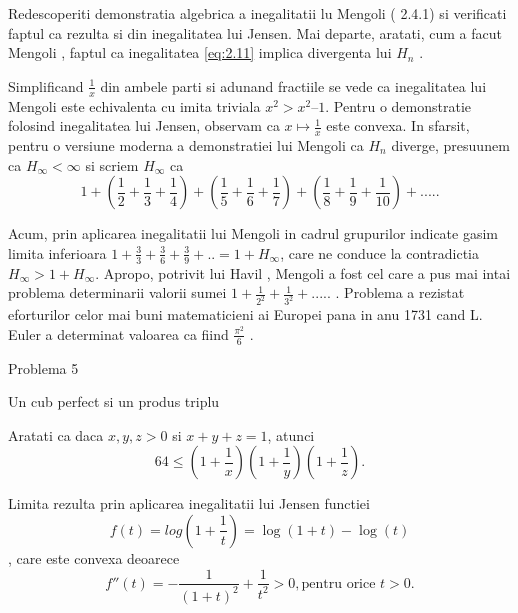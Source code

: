 \documentclass[a4paper,12pt,oneside]{report}
\begin{document}
Redescoperiti demonstratia algebrica a inegalitatii lu Mengoli ( 2.4.1) si verificati faptul ca rezulta si din inegalitatea lui Jensen. Mai departe, aratati, cum a facut Mengoli , faptul ca inegalitatea \ref{eq:2.11} implica divergenta lui \(H_{n}\) . 

Simplificand \(\frac{1}{x}\) din ambele parti si adunand fractiile se vede ca inegalitatea lui Mengoli este echivalenta cu imita triviala \(x^{2} >  x^{2} – 1\). Pentru o demonstratie folosind inegalitatea lui Jensen, observam ca \(x \mapsto \frac{1}{x}\) este convexa. In sfarsit, pentru o versiune moderna a demonstratiei lui Mengoli ca \(H_{n}\) diverge, presuunem ca \(H_{\infty }< \infty\) si scriem \(H_{\infty }\) ca 
\begin{displaymath}
  1 + \left ( \frac{1}{2} + \frac{1}{3} + \frac{1}{4} \right ) + \left ( \frac{1}{5} + \frac{1}{6} + \frac{1}{7} \right ) + \left ( \frac{1}{8} + \frac{1}{9} +\frac{1}{10} \right )+.... . 
\end{displaymath}

Acum, prin aplicarea inegalitatii lui Mengoli in cadrul grupurilor indicate gasim limita inferioara \(1 + \frac{3}{3} + \frac{3}{6} + \frac{3}{9} + ..= 1 + H_{\infty }\), care ne conduce la contradictia \(H_{\infty } > 1 + H_{\infty }\). Apropo, potrivit lui Havil , Mengoli a fost cel care a pus mai intai problema determinarii valorii sumei \(1 + \frac{1}{2^{2}} + \frac{1}{3^{2}} + .....\) .
Problema a rezistat eforturilor celor mai buni matematicieni ai Europei pana in anu 1731 cand L. Euler a determinat valoarea ca fiind \(\frac{\pi^{2}}{6}\) . 

Problema 5 

Un cub perfect si un produs triplu

Aratati ca daca \(x , y , z > 0\) si \(x+ y + z = 1\), atunci 
\begin{displaymath}
  64 \leq \left ( 1 + \frac{1}{x} \right )\left ( 1 + \frac{1}{y} \right )\left ( 1 + \frac{1}{z} \right ). 
\end{displaymath}

Limita rezulta prin aplicarea inegalitatii lui Jensen functiei 
\begin{displaymath}
  f\left ( t \right ) = log \left ( 1+\frac{1}{t} \right ) = \log \left ( 1 + t \right ) - \log \left ( t \right )
\end{displaymath},
care este convexa deoarece 
\begin{displaymath}
  {f}''\left ( t \right ) = -\frac{1}{\left ( 1 + t \right )^{2}} + \frac{1}{t^{2}} > 0,  \text{pentru orice } t > 0 .
\end{displaymath} 
 
\end{document}

